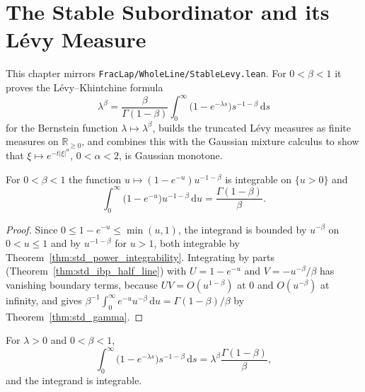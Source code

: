 \chapter{The Stable Subordinator and its Lévy Measure}

This chapter mirrors \texttt{FracLap/WholeLine/StableLevy.lean}. For $0 < \beta < 1$ it proves the Lévy--Khintchine formula
\[
  \lambda^\beta = \frac{\beta}{\Gamma(1 - \beta)} \int_0^\infty \bigl(1 - e^{-\lambda s}\bigr) s^{-1-\beta}\, \mathrm{d}s
\]
for the Bernstein function $\lambda \mapsto \lambda^\beta$, builds the truncated Lévy measures as finite measures on $\mathbb{R}_{\ge 0}$, and combines this with the Gaussian mixture calculus to show that $\xi \mapsto e^{-t \lvert \xi \rvert^\alpha}$, $0 < \alpha < 2$, is Gaussian monotone.

\begin{lemma}\label{lem:levy_basic}
\leanok
For $0 < \beta < 1$ the function $u \mapsto (1 - e^{-u}) u^{-1-\beta}$ is integrable on $\{u > 0\}$ and
\[
  \int_0^\infty \bigl(1 - e^{-u}\bigr) u^{-1-\beta}\, \mathrm{d}u = \frac{\Gamma(1 - \beta)}{\beta}.
\]
\end{lemma}

\begin{proof}
\leanok
Since $0 \le 1 - e^{-u} \le \min(u, 1)$, the integrand is bounded by $u^{-\beta}$ on $0 < u \le 1$ and by $u^{-1-\beta}$ for $u > 1$, both integrable by Theorem~\ref{thm:std_power_integrability}. Integrating by parts (Theorem~\ref{thm:std_ibp_half_line}) with $U = 1 - e^{-u}$ and $V = -u^{-\beta}/\beta$ has vanishing boundary terms, because $U V = O(u^{1-\beta})$ at $0$ and $O(u^{-\beta})$ at infinity, and gives $\beta^{-1} \int_0^\infty e^{-u} u^{-\beta}\, \mathrm{d}u = \Gamma(1 - \beta)/\beta$ by Theorem~\ref{thm:std_gamma}.
\end{proof}

\begin{lemma}\label{lem:levy_scaled}
\leanok
For $\lambda > 0$ and $0 < \beta < 1$,
\[
  \int_0^\infty \bigl(1 - e^{-\lambda s}\bigr) s^{-1-\beta}\, \mathrm{d}s = \lambda^\beta \frac{\Gamma(1 - \beta)}{\beta},
\]
and the integrand is integrable.
\end{lemma}

